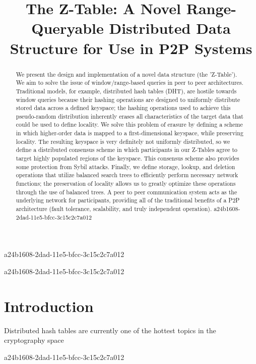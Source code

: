 \documentclass[12pt]{article}
\title{The Z-Table: A Novel Range-Queryable Distributed Data Structure for Use in P2P Systems}
\begin{document}
a24b1608-2dad-11e5-bfcc-3c15c2c7a012
\maketitle

\begin{abstract}
We present the design and implementation of a novel data structure (the 'Z-Table'). We aim to solve the issue of window/range-based queries in peer to peer architectures. Traditional models, for example,  distributed hash tables (DHT), are hostile towards window queries because their hashing operations are designed to uniformly distribute stored data across a defined keyspace; the hashing operations used to achieve this pseudo-random distribution inherently erases all characteristics of the target data that could be used to define locality. We solve this problem of erasure by defining a scheme in which higher-order data is mapped to a first-dimensional keyspace, while preserving locality. The resulting keyspace is very definitely not uniformly distributed, so we define a distributed consensus scheme in which participants in our Z-Tables agree to target highly populated regions of the keyspace. This consensus scheme also provides some protection from Sybil attacks. Finally, we define storage, lookup, and deletion operations that utilize balanced search trees to efficiently perform necessary network functions; the preservation of locality allows us to greatly optimize these operations through the use of balanced trees. A peer to peer communication system acts as the underlying network for participants, providing all of the traditional benefits of a P2P architecture (fault tolerance, scalability, and truly independent operation).
a24b1608-2dad-11e5-bfcc-3c15c2c7a012\end{abstract}
a24b1608-2dad-11e5-bfcc-3c15c2c7a012

\newpage
\section{Introduction}
Distributed hash tables are currently one of the hottest topics in the cryptography space~\cite{Stoica:2001dj,Rowstron:2001ea,Ratnasamy:2001wn}

a24b1608-2dad-11e5-bfcc-3c15c2c7a012\printbibliography
\end{document}
